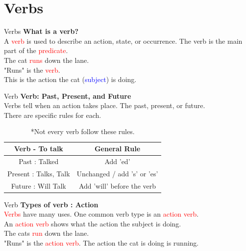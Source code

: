 \documentclass{beamer}
\begin{document}
\section{Verbs}
\begin{frame} {Verbs}
\centering 
\textbf{What is a verb?}\\
\vspace{0.2in}
A \textcolor{red}{verb} is used to describe an action, state, or occurrence. The verb is the main part of the \textcolor{red}{predicate}.\\
\vspace{0.2in}
The cat \textcolor{red}{runs} down the lane.\\
\vspace{0.2in}
"Runs" is the \textcolor{red}{verb}.\\
\vspace{0.2in}
This is the action the cat (\textcolor{blue}{subject}) is doing.

\end{frame}
\begin{frame}{Verb}
\centering 
\textbf{Verb: Past, Present, and Future}\\
Verbs tell when an action takes place. The past, present, or future.\\ There are specific rules for each.\\
\begin{table}[]
    \centering
    \begin{tabular}{|c|c|}
    \hline
Verb - To talk & General Rule\\
\hline
Past : Talked & Add 'ed'\\
\hline
Present : Talks, Talk & Unchanged / add 's' or 'es'\\
\hline
Future : Will Talk & Add 'will' before the verb\\ 
\hline


    \end{tabular}
    \caption{*Not every verb follow these rules.}
    \label{tab:placeholder}
\end{table}

    
\end{frame}
\begin{frame}{Verb}
\centering
\textbf{Types of verb : Action}\\ 
\vspace{0.2in}
\textcolor{red}{Verbs} have many uses. One common verb type is an \textcolor{red}{action verb}.\\
\vspace{0.2in}
An \textcolor{red}{action verb} shows what the action the subject is doing.\\
\vspace{0.2in}
The cats \textcolor{red}{run} down the lane.\\
\vspace{0.2in}
"Runs" is the \textcolor{red}{action verb}. The action the cat is doing is running.
    
\end{frame}
\end{document}
